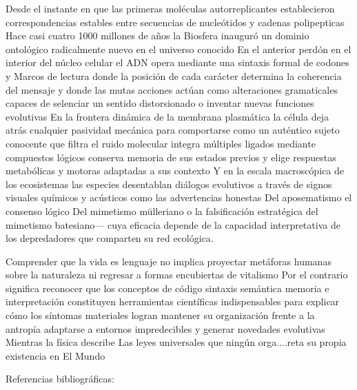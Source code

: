Desde el instante en que las primeras moléculas autorreplicantes establecieron correspondencias estables entre secuencias de nucleótidos y cadenas polipepticas Hace casi cuatro 1000 millones de años la Biosfera inauguró un dominio ontológico radicalmente nuevo en el universo conocido
En el anterior perdón en el interior del núcleo celular el ADN opera mediante una sintaxis formal de codones y Marcos de lectura donde la posición de cada carácter determina la coherencia del mensaje y donde las mutas acciones actúan como alteraciones gramaticales capaces de selenciar un sentido distorsionado o inventar nuevas funciones evolutivas
En la frontera dinámica de la membrana plasmática la célula deja atrás cualquier pasividad mecánica para comportarse como un auténtico sujeto conocente que filtra el ruido molecular integra múltiples ligados mediante compuestos lógicos conserva memoria de sus estados previos y elige respuestas metabólicas y motoras adaptadas a sus contexto
Y en la escala macroscópica de los ecosistemas las especies desentablan diálogos evolutivos a través de signos visuales químicos y acústicos como las advertencias honestas Del aposematismo el consenso lógico Del mimetismo mülleriano o la falsificación estratégica del mimetismo batesiano— cuya eficacia depende de la capacidad interpretativa de los depredadores que comparten su red ecológica.

Comprender que la vida es lenguaje no implica proyectar metáforas humanas sobre la naturaleza ni regresar a formas encubiertas de vitalismo
Por el contrario significa reconocer que los conceptos de código sintaxis semántica memoria e interpretación constituyen herramientas científicas indispensables para explicar cómo los síntomas materiales logran mantener su organización frente a la antropía adaptarse a entornos impredecibles y generar novedades evolutivas 
Mientras la física describe Las leyes universales que ningún orga....reta su propia existencia en El Mundo

Referencias bibliográficas:

